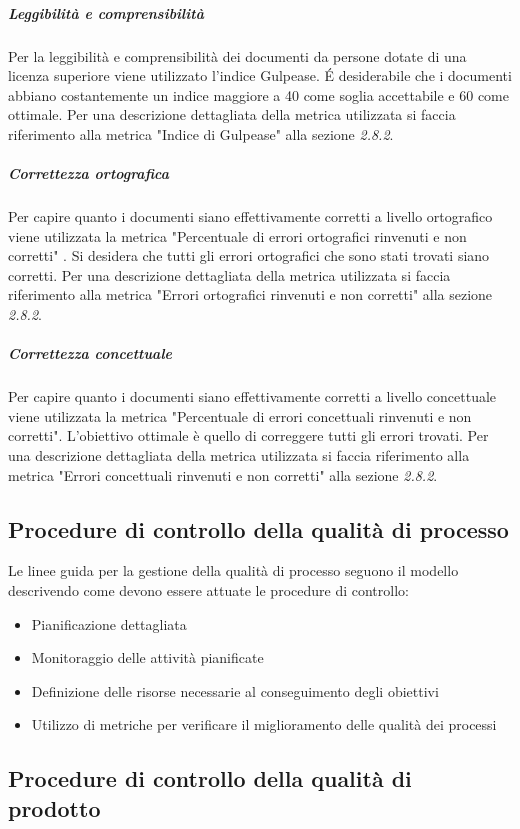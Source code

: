 \subparagraph{Leggibilità e comprensibilità}
Per la leggibilità e comprensibilità dei documenti da persone dotate di una licenza superiore viene utilizzato l’indice Gulpease. \'E desiderabile che i documenti abbiano costantemente un indice maggiore a 40 come soglia accettabile e 60 come ottimale. Per una descrizione dettagliata della metrica utilizzata si faccia riferimento
alla metrica "Indice di Gulpease" alla sezione \emph{2.8.2}.

\subparagraph{Correttezza ortografica}
Per capire quanto i documenti siano effettivamente corretti a livello ortografico viene utilizzata la metrica "Percentuale di errori ortografici rinvenuti e non corretti" . Si desidera che tutti gli errori ortografici che sono stati trovati siano corretti. Per una descrizione dettagliata della metrica utilizzata si faccia riferimento alla metrica "Errori ortografici rinvenuti e non corretti" alla sezione \emph{2.8.2}.

\subparagraph{Correttezza concettuale}
Per capire quanto i documenti siano effettivamente corretti a livello concettuale viene utilizzata la metrica "Percentuale di errori concettuali rinvenuti e non corretti". L'obiettivo ottimale è quello di correggere tutti gli errori trovati. Per una descrizione dettagliata della metrica utilizzata si faccia riferimento alla metrica "Errori concettuali rinvenuti e non corretti" alla sezione \emph{2.8.2}.




\subsection{Procedure di controllo della qualità di processo}

Le linee guida per la gestione della qualità di processo seguono il modello  descrivendo come devono essere attuate le procedure di controllo:

\begin{itemize}
\item Pianificazione dettagliata
\item Monitoraggio delle attività pianificate
\item Definizione delle risorse necessarie al conseguimento degli obiettivi
\item Utilizzo di metriche per verificare il miglioramento delle qualità dei processi
\end{itemize}

\subsection{Procedure di controllo della qualità di prodotto}

